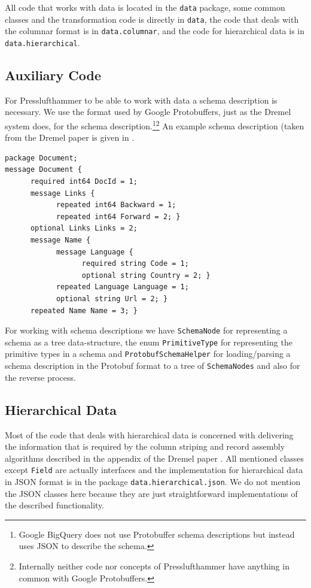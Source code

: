 All code that works with data is located in the \texttt{data} package,
some common classes and the transformation code is directly in \texttt{data},
the code that deals with the columnar format is in \texttt{data.columnar},
and the code for hierarchical data is in \texttt{data.hierarchical}.

\subsection{Auxiliary Code}
For Presslufthammer to be able to work with data a schema description is
necessary. We use the format used by Google Protobuffers, just as
the Dremel system does, for the schema description.\footnote{Google BigQuery
\cite{bigquery} does not use Protobuffer schema descriptions but instead uses
JSON to describe the schema.}\footnote{Internally neither code nor concepts
of Presslufthammer have anything in common with Google Protobuffers.}
An example schema description (taken from the Dremel paper \cite{melnik2010dremel}
is given in .

\begin{lstlisting}[float=htpb,label={lst:document-schema},caption={Protobuf-like schema definition for the documents data-set.}]
package Document;
message Document {
      required int64 DocId = 1;
      message Links {
            repeated int64 Backward = 1;
            repeated int64 Forward = 2; }
      optional Links Links = 2;
      message Name {
            message Language {
                  required string Code = 1;
                  optional string Country = 2; }
            repeated Language Language = 1;
            optional string Url = 2; }
      repeated Name Name = 3; }
\end{lstlisting}

For working with schema descriptions we have \texttt{SchemaNode} for
representing a schema as a tree data-structure, the enum \texttt{PrimitiveType}
for representing the primitive types in a schema and \texttt{ProtobufSchemaHelper}
for loading/parsing a schema description in the Protobuf format to a
tree of \texttt{SchemaNodes} and also for the reverse process.

\subsection{Hierarchical Data}
Most of the code that deals with hierarchical data is concerned with
delivering the information that is required by the column striping and record
assembly algorithms described in the appendix of the Dremel paper \cite{melnik2010dremel}.
All mentioned classes except \texttt{Field} are actually interfaces and the
implementation for hierarchical data in JSON format is in the package
\texttt{data.hierarchical.json}. We do not mention the JSON classes here
because they are just straightforward implementations of the described
functionality.


